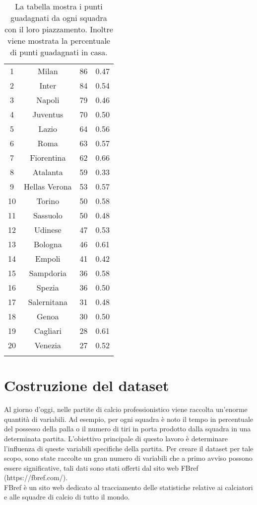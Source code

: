 	\begin{table}[!h]%
	\renewcommand{\arraystretch}{1.7}
	\centering
	\begin{tabular}{c c c c}
		\hline	
		\rowcolor{SchoolColor}
		\intest{Posizione} & \intest{Squadra} & \intest{Punti} & \intest{ \% casa}  \\	
		\hline			
		1 & Milan & 86 & 0.47\\
		2 & Inter & 84 & 0.54\\
		3 & Napoli & 79 & 0.46\\
		4 & Juventus & 70 & 0.50\\
		5 & Lazio & 64 & 0.56\\
		6 & Roma & 63 & 0.57\\
		7 & Fiorentina & 62 & 0.66\\
		8 & Atalanta & 59 & 0.33\\
		9 & Hellas Verona & 53 & 0.57\\
		10 & Torino & 50 & 0.58\\
		11 & Sassuolo & 50 & 0.48\\
		12 & Udinese & 47 & 0.53\\
		13 & Bologna & 46 & 0.61\\
		14 & Empoli & 41 & 0.42\\
		15 & Sampdoria & 36 & 0.58\\
		16 & Spezia & 36 & 0.50\\
		17 & Salernitana & 31 & 0.48\\
		18 & Genoa & 30 & 0.50\\
		19 & Cagliari & 28 & 0.61\\
		20 & Venezia & 27 & 0.52\\
			\hline
		 & & & \\
	
	\end{tabular} \hbox{}

	\caption{La tabella mostra i punti guadagnati da ogni squadra con il loro piazzamento. Inoltre viene mostrata la percentuale di punti guadagnati in casa.} \label{tab:ranking}
\end{table}

\section{Costruzione del dataset}

Al giorno d'oggi, nelle partite di calcio professionistico viene raccolta un'enorme quantità di variabili. Ad esempio, per ogni squadra è noto il tempo in percentuale del possesso della palla o il numero di tiri in porta prodotto dalla squadra in una determinata partita. L'obiettivo principale di questo lavoro è determinare l'influenza di queste variabili specifiche della partita. Per creare il dataset per tale scopo, sono state raccolte un gran numero di variabili che a primo avviso possono essere significative, tali dati sono stati offerti dal sito web FBref (https://fbref.com/).\\ FBref è un sito web dedicato al tracciamento delle statistiche relative ai calciatori e alle squadre di calcio di tutto il mondo. \\

